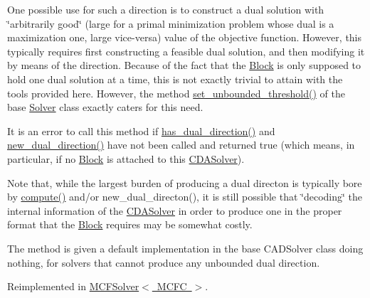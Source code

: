 One possible use for such a direction is to construct a dual solution with \char`\"{}arbitrarily good\char`\"{} (large for a primal minimization problem whose dual is a maximization one, large vice-\/versa) value of the objective function. However, this typically requires first constructing a feasible dual solution, and then modifying it by means of the direction. Because of the fact that the \mbox{\hyperlink{class_s_m_spp__di__unipi__it_1_1_block}{Block}} is only supposed to hold one dual solution at a time, this is not exactly trivial to attain with the tools provided here. However, the method \mbox{\hyperlink{class_s_m_spp__di__unipi__it_1_1_solver_ae1717d1363782e086aa797e7437c0352}{set\+\_\+unbounded\+\_\+threshold()}} of the base \mbox{\hyperlink{class_s_m_spp__di__unipi__it_1_1_solver}{Solver}} class exactly caters for this need.

It is an error to call this method if \mbox{\hyperlink{class_s_m_spp__di__unipi__it_1_1_c_d_a_solver_a4247feaa72c255f28a2a71b5e634b60a}{has\+\_\+dual\+\_\+direction()}} and \mbox{\hyperlink{class_s_m_spp__di__unipi__it_1_1_c_d_a_solver_ad83925e362d49bbe570a881791e45ea0}{new\+\_\+dual\+\_\+direction()}} have not been called and returned true (which means, in particular, if no \mbox{\hyperlink{class_s_m_spp__di__unipi__it_1_1_block}{Block}} is attached to this \mbox{\hyperlink{class_s_m_spp__di__unipi__it_1_1_c_d_a_solver}{C\+D\+A\+Solver}}).

Note that, while the largest burden of producing a dual directon is typically bore by \mbox{\hyperlink{class_s_m_spp__di__unipi__it_1_1_solver_a504d4e3e174c7a518cc66156a8a45ce5}{compute()}} and/or new\+\_\+dual\+\_\+directon(), it is still possible that \char`\"{}decoding\char`\"{} the internal information of the \mbox{\hyperlink{class_s_m_spp__di__unipi__it_1_1_c_d_a_solver}{C\+D\+A\+Solver}} in order to produce one in the proper format that the \mbox{\hyperlink{class_s_m_spp__di__unipi__it_1_1_block}{Block}} requires may be somewhat costly.

The method is given a default implementation in the base C\+A\+D\+Solver class doing nothing, for solvers that cannot produce any unbounded dual direction. 

Reimplemented in \mbox{\hyperlink{class_s_m_spp__di__unipi__it_1_1_m_c_f_solver_a20bea98e93ae37db17f0a0424be71987}{M\+C\+F\+Solver$<$ M\+C\+F\+C $>$}}.

\mbox{\label{class_s_m_spp__di__unipi__it_1_1_c_d_a_solver_a347d37171494bf83416a48b279b94d5a}} 
